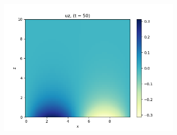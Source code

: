 \documentclass[11pt,
        usenames, %
        dvipsnames %
    ]{report}
\begin{document}
\begin{figure}[!h]
\begin{subfigure}{0.3\textwidth}
        \includegraphics[width=\textwidth]{../sims_old/2d_0_no_g/no_g_uz_t50.png}
    \end{subfigure}


\end{figure}
\end{document}
